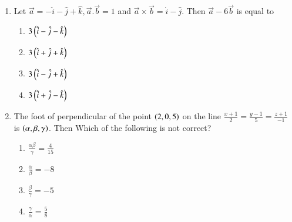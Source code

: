 \documentclass[journal]{IEEEtran}
\begin{document}
\begin{enumerate}
    \item Let $\overrightarrow{a}=-\hat{i}-\hat{j}+\hat{k}, \overrightarrow{a}.\overrightarrow{b}=1$ and $\overrightarrow{a}\times \overrightarrow{b}=\hat{i}-\hat{j}$. Then $\overrightarrow{a}-6\overrightarrow{b}$ is equal to 
		\begin{multicols}{1}
			\begin{enumerate}
				\item $3\left(\hat{i}-\hat{j}-\hat{k}\right)$
    \item $3\left(\hat{i}+\hat{j}+\hat{k}\right)$
    \item $3\left(\hat{i}-\hat{j}+\hat{k}\right)$
    \item $3\left(\hat{i}+\hat{j}-\hat{k}\right)$
			\end{enumerate}
		\end{multicols}

    \item The foot of perpendicular of the point $\left(2,0,5\right)$ on the line $\frac{x+1}{2}=\frac{y-1}{5}=\frac{z+1}{-1}$ is $\left(\alpha,\beta,\gamma\right)$. Then Which of the following is not correct?
		\begin{multicols}{1}
			\begin{enumerate}
				
				\item $\frac{\alpha \beta}{\gamma}=\frac{4}{15}$
    \item $\frac{\alpha }{\beta}=-8$
     \item $\frac{\beta }{\gamma}=-5$
      \item $\frac{\gamma }{\alpha}=\frac{5}{8}$
			\end{enumerate}
		\end{multicols}


\end{enumerate}
\end{document}
